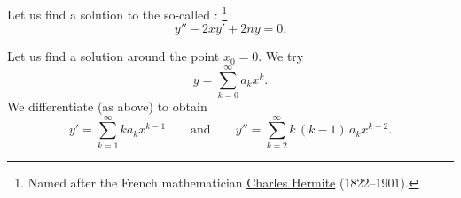 \begin{example}
Let us find a solution to the so-called
\emph{}:%
\footnote{Named after the French mathematician
\href{http://en.wikipedia.org/wiki/Hermite}{Charles Hermite}
(1822--1901).}
\begin{equation*}
y'' -2xy' + 2n y = 0 .
\end{equation*}

Let us find a solution around the point $x_0 = 0$.
We try
\begin{equation*}
y = \sum_{k=0}^\infty a_k x^k .
\end{equation*}
We differentiate (as above) to obtain
\begin{equation*}
y' = \sum_{k=1}^\infty k a_k x^{k-1} 
\qquad \text{and} \qquad
y'' = \sum_{k=2}^\infty k\,(k-1) \, a_k x^{k-2} .
\end{equation*}


\end{example}
